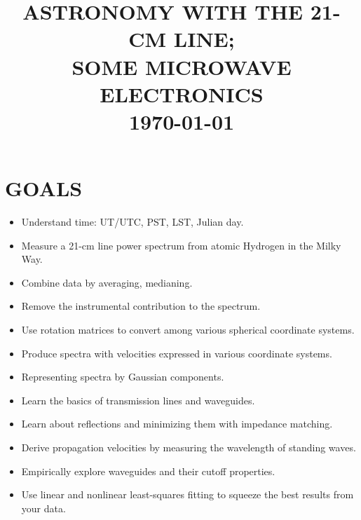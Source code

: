 \documentclass[12pt,preprint]{aastex}
\begin{document}
\def\simlt{\lower.5ex\hbox{$\; \buildrel < \over \sim \;$}}
\def\simgt{\lower.5ex\hbox{$\; \buildrel > \over \sim \;$}}

\title {ASTRONOMY WITH THE 21-CM LINE; \\ SOME MICROWAVE ELECTRONICS \\ \today}

\tableofcontents

\section{GOALS} \begin{itemize}

\item Understand time: UT/UTC, PST, LST, Julian day. 

\item Measure a 21-cm line power spectrum from atomic Hydrogen in the
  Milky Way.

\item Combine data by averaging, medianing.

\item Remove the instrumental contribution to the spectrum.

\item Use rotation matrices to convert among various spherical
  coordinate systems.

\item Produce spectra with velocities expressed in various coordinate
  systems.

\item Representing spectra by Gaussian components.

\item Learn the basics of transmission lines and waveguides.

\item Learn about reflections and minimizing them with impedance
  matching.

\item Derive propagation velocities by measuring the wavelength of
  standing waves.

\item Empirically explore waveguides and their cutoff properties.

\item Use linear and nonlinear least-squares fitting to squeeze the best
  results from your data.

\end{itemize}
\end{document}
